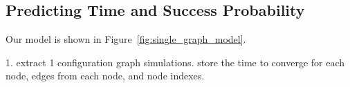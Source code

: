 \documentclass[openacc]{rsproca_new}%
\newcommand{\pj}[1]{\textcolor{magenta}{(Puneet: #1)}}
\begin{document}
\subsection{Predicting Time and Success Probability}
Our model is shown in Figure~\ref{fig:single_graph_model}. 


1. extract 1 configuration graph simulations. store the time to converge for each node, edges from each node, and node indexes.




\end{document}
